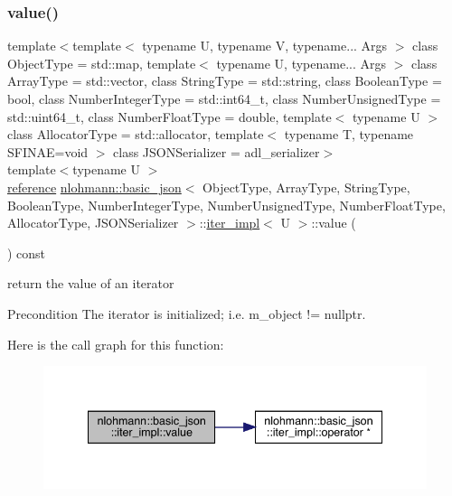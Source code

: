 \subsubsection{\texorpdfstring{value()}{value()}}
{\footnotesize\ttfamily template$<$template$<$ typename U, typename V, typename... Args $>$ class Object\+Type = std\+::map, template$<$ typename U, typename... Args $>$ class Array\+Type = std\+::vector, class String\+Type  = std\+::string, class Boolean\+Type  = bool, class Number\+Integer\+Type  = std\+::int64\+\_\+t, class Number\+Unsigned\+Type  = std\+::uint64\+\_\+t, class Number\+Float\+Type  = double, template$<$ typename U $>$ class Allocator\+Type = std\+::allocator, template$<$ typename T, typename S\+F\+I\+N\+A\+E=void $>$ class J\+S\+O\+N\+Serializer = adl\+\_\+serializer$>$ \\
template$<$typename U $>$ \\
\mbox{\hyperlink{classnlohmann_1_1basic__json_1_1iter__impl_ae09599e9cb4a947020a0265c0c4f3d5e}{reference}} \mbox{\hyperlink{classnlohmann_1_1basic__json}{nlohmann\+::basic\+\_\+json}}$<$ Object\+Type, Array\+Type, String\+Type, Boolean\+Type, Number\+Integer\+Type, Number\+Unsigned\+Type, Number\+Float\+Type, Allocator\+Type, J\+S\+O\+N\+Serializer $>$\+::\mbox{\hyperlink{classnlohmann_1_1basic__json_1_1iter__impl}{iter\+\_\+impl}}$<$ U $>$\+::value (\begin{DoxyParamCaption}{ }\end{DoxyParamCaption}) const\hspace{0.3cm}{\ttfamily [inline]}}



return the value of an iterator 

\begin{DoxyPrecond}{Precondition}
The iterator is initialized; i.\+e. {\ttfamily m\+\_\+object != nullptr}. 
\end{DoxyPrecond}
Here is the call graph for this function\+:\nopagebreak
\begin{figure}[H]
\begin{center}
\leavevmode
\includegraphics[width=341pt]{classnlohmann_1_1basic__json_1_1iter__impl_a92e849ca687355935c02f492be936b68_cgraph}
\end{center}
\end{figure}


